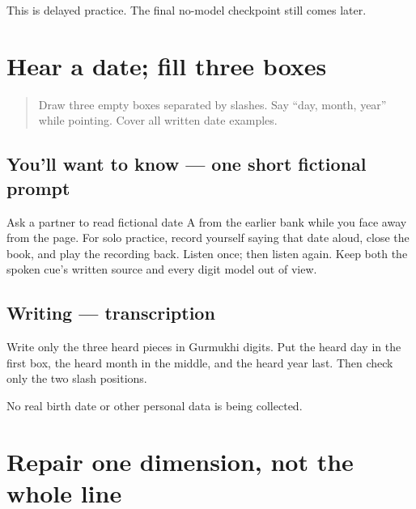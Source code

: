 \begin{tcolorbox}[breakable,colback=teal!4,colframe=teal!35!black,title={Before you move on}]
This is delayed practice. The final no-model checkpoint still comes later.
\end{tcolorbox}
\section[\texorpdfstring{\pa{ਤਾਰੀਖ਼} (tārīkh)}{ਤਾਰੀਖ਼ (tārīkh)}]{Hear a date; fill three boxes}

\label{lesson:PA-W09-date-dictation}



\begin{quote}
Draw three empty boxes separated by slashes. Say “day, month, year” while pointing. Cover all written date examples.
\end{quote}

\subsection*{You'll want to know — one short fictional prompt}
Ask a partner to read fictional date A from the earlier bank while you face away from the page. For solo practice, record yourself saying that date aloud, close the book, and play the recording back. Listen once; then listen again. Keep both the spoken cue's written source and every digit model out of view.

\subsection*{Writing — transcription}
Write only the three heard pieces in Gurmukhi digits. Put the heard day in the first box, the heard month in the middle, and the heard year last. Then check only the two slash positions.

\begin{tcolorbox}[breakable,colback=teal!4,colframe=teal!35!black,title={Before you move on}]
No real birth date or other personal data is being collected.
\end{tcolorbox}
\section[\texorpdfstring{\pa{ਤਾਰੀਖ਼}: \_\_/\_\_/\_\_\_\_ (date field repair)}{ਤਾਰੀਖ਼: \_\_/\_\_/\_\_\_\_ (date field repair)}]{Repair one dimension, not the whole line}

\label{lesson:PA-W09-date-repair}



